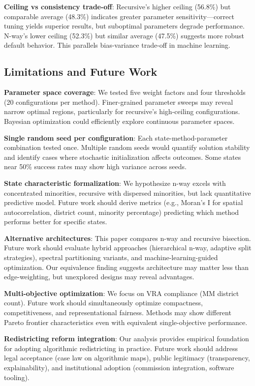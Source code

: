 \textbf{Ceiling vs consistency trade-off}: Recursive's higher ceiling (56.8\%) but comparable average (48.3\%) indicates greater parameter sensitivity—correct tuning yields superior results, but suboptimal parameters degrade performance. N-way's lower ceiling (52.3\%) but similar average (47.5\%) suggests more robust default behavior. This parallels bias-variance trade-off in machine learning.

\subsection{Limitations and Future Work}

\textbf{Parameter space coverage}: We tested five weight factors and four thresholds (20 configurations per method). Finer-grained parameter sweeps may reveal narrow optimal regions, particularly for recursive's high-ceiling configurations. Bayesian optimization could efficiently explore continuous parameter spaces.

\textbf{Single random seed per configuration}: Each state-method-parameter combination tested once. Multiple random seeds would quantify solution stability and identify cases where stochastic initialization affects outcomes. Some states near 50\% success rates may show high variance across seeds.

\textbf{State characteristic formalization}: We hypothesize n-way excels with concentrated minorities, recursive with dispersed minorities, but lack quantitative predictive model. Future work should derive metrics (e.g., Moran's I for spatial autocorrelation, district count, minority percentage) predicting which method performs better for specific states.

\textbf{Alternative architectures}: This paper compares n-way and recursive bisection. Future work should evaluate hybrid approaches (hierarchical n-way, adaptive split strategies), spectral partitioning variants, and machine-learning-guided optimization. Our equivalence finding suggests architecture may matter less than edge-weighting, but unexplored designs may reveal advantages.

\textbf{Multi-objective optimization}: We focus on VRA compliance (MM district count). Future work should simultaneously optimize compactness, competitiveness, and representational fairness. Methods may show different Pareto frontier characteristics even with equivalent single-objective performance.

\textbf{Redistricting reform integration}: Our analysis provides empirical foundation for adopting algorithmic redistricting in practice. Future work should address legal acceptance (case law on algorithmic maps), public legitimacy (transparency, explainability), and institutional adoption (commission integration, software tooling).

